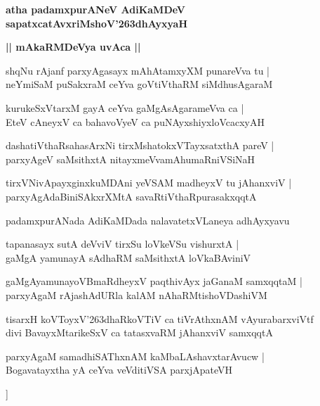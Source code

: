 \documentclass[twoside,12pt,openright]{book}
\def\S{\char'263}
\newcounter{shloka}[chapter]
\def\uvaca#1{\centerline{{\large\textbf{#1}}}}
\begin{document}
\begin{center}
{\LARGE\bfseries atha padamxpurANeV AdiKaMDeV sapatxcatAvxriMshoV\S dhAyxyaH}
\end{center}

\uvaca{|| mAkaRMDeVya uvAca ||}

\begin{shloka}
shqNu rAjanf parxyAgasayx mAhAtamxyXM punareVva tu |\\
neYmiSaM puSakxraM ceYva goVtiVthaRM siMdhusAgaraM 
\end{shloka}

\begin{shloka}
kurukeSxVtarxM gayA ceYva gaMgAsAgarameVva ca |\\
EteV cAneyxV ca bahavoVyeV ca puNAyxshiyxloVcacxyAH 
\end{shloka}

\begin{shloka}
dashatiVthaRsahasArxNi tirxMshatokxVTayxsatxthA pareV |\\
parxyAgeV saMsithxtA nitayxmeVvamAhumaRniVSiNaH 
\end{shloka}

\begin{shloka}
tirxVNivApayxginxkuMDAni yeVSAM madheyxV tu jAhanxviV |\\
parxyAgAdaBiniSAkxrXMtA savaRtiVthaRpurasakxqqtA 
\end{shloka}

\begin{center}
padamxpurANada AdiKaMDada nalavatetxVLaneya adhAyxyavu
\end{center}

\begin{shloka}
tapanasayx sutA deVviV tirxSu loVkeVSu vishurxtA |\\
gaMgA yamunayA sAdhaRM saMsithxtA loVkaBAviniV
\end{shloka}

\begin{shloka}
gaMgAyamunayoVBmaRdheyxV paqthivAyx jaGanaM samxqqtaM |\\
parxyAgaM rAjashAdURla kalAM nAhaRMtishoVDashiVM 
\end{shloka}

\begin{shloka}
tisarxH koVToyxV\S dhaRkoVTiV ca tiVrAthxnAM vAyurabarxviVtf \\
divi BavayxMtarikeSxV ca tatasxvaRM jAhanxviV samxqqtA 
\end{shloka}

\begin{shloka}
parxyAgaM samadhiSAThxnAM kaMbaLAshavxtarAvucw |\\
Bogavatayxtha yA ceYva veVditiVSA parxjApateVH
\end{shloka}]
\end{document}
